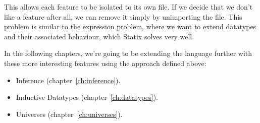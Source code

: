 This allows each feature to be isolated to its own file. If we decide that we don't like a feature after all, we can remove it simply by unimporting the file. This problem is similar to the expression problem\cite{expression_problem}, where we want to extend datatypes and their associated behaviour, which Statix solves very well.

In the following chapters, we're going to be extending the language further with these more interesting features using the approach defined above:
\begin{itemize}
	\item Inference (chapter~\ref{ch:inference}).
	\item Inductive Datatypes (chapter~\ref{ch:datatypes}).
	\item Universes (chapter~\ref{ch:universes}).
\end{itemize}

